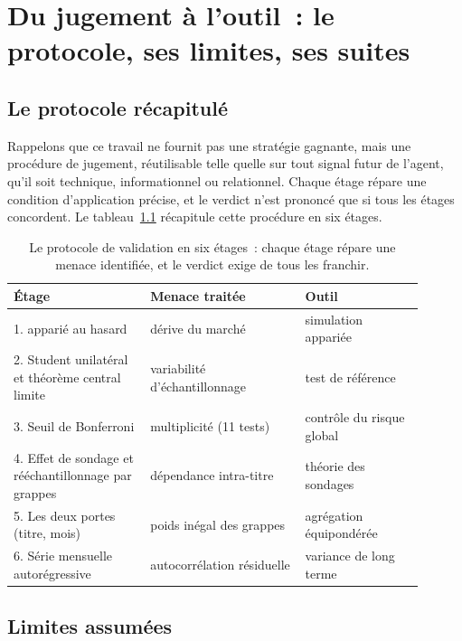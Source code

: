 \chapter{Du jugement à l'outil~: le protocole, ses limites, ses suites}
\label{chap:protocole}

\section{Le protocole récapitulé}
\label{sec:protocole}

Rappelons que ce travail ne fournit pas une stratégie gagnante, mais une
procédure de jugement, réutilisable telle quelle sur tout signal futur de
l'agent, qu'il soit technique, informationnel ou relationnel. Chaque étage
répare une condition d'application précise, et le verdict n'est prononcé que
si tous les étages concordent. Le tableau~\ref{tab:protocole} récapitule cette
procédure en six étages.

\begin{table}[H]
\centering
\caption{Le protocole de validation en six étages~: chaque étage répare
une menace identifiée, et le verdict exige de tous les franchir.}
\label{tab:protocole}
\small
\begin{tabular}{@{}p{0.30\linewidth}p{0.34\linewidth}p{0.26\linewidth}@{}}
\toprule
Étage & Menace traitée & Outil \\
\midrule
1. \edgevar{} apparié au hasard & dérive du marché & simulation appariée \\
2. Student unilatéral et théorème central limite & variabilité d'échantillonnage & test de référence \\
3. Seuil de Bonferroni & multiplicité (11 tests) & contrôle du risque global \\
4. Effet de sondage et rééchantillonnage par grappes & dépendance intra-titre & théorie des sondages \\
5. Les deux portes (titre, mois) & poids inégal des grappes & agrégation équipondérée \\
6. Série mensuelle autorégressive & autocorrélation résiduelle & variance de long terme \\
\bottomrule
\end{tabular}
\end{table}


\section{Limites assumées}
\label{sec:limites}

